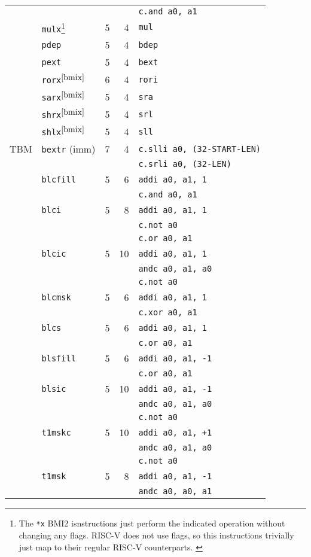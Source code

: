\begin{longtable}[c]{@{}llrrl@{}}
     &                        &   &    & {\tt c.and a0, a1}\tabularnewline
\cline{2-5}
     & {\tt mulx}\footnote{
         The \texttt{*x} BMI2 isnstructions just perform the indicated operation without
	 changing any flags. RISC-V does not use flags, so this instructions trivially
	 just map to their regular RISC-V counterparts.
                \label{bmix}} & 5 &  4 & {\tt mul}\tabularnewline
\cline{2-5}
     & {\tt pdep}             & 5 &  4 & {\tt bdep}\tabularnewline
\cline{2-5}
     & {\tt pext}             & 5 &  4 & {\tt bext}\tabularnewline
\cline{2-5}
     & {\tt rorx}$^{\ref{bmix}}$ & 6 &  4 & {\tt rori}\tabularnewline
\cline{2-5}
     & {\tt sarx}$^{\ref{bmix}}$ & 5 &  4 & {\tt sra}\tabularnewline
\cline{2-5}
     & {\tt shrx}$^{\ref{bmix}}$ & 5 &  4 & {\tt srl}\tabularnewline
\cline{2-5}
     & {\tt shlx}$^{\ref{bmix}}$ & 5 &  4 & {\tt sll}\tabularnewline
\midrule
TBM  & {\tt bextr} (imm)      & 7 &  4 & {\tt c.slli a0, (32-START-LEN)}\tabularnewline
     &                        &   &    & {\tt c.srli a0, (32-LEN)}\tabularnewline
\cline{2-5}
     & {\tt blcfill}          & 5 &  6 & {\tt addi a0, a1, 1}\tabularnewline
     &                        &   &    & {\tt c.and a0, a1}\tabularnewline
\cline{2-5}
     & {\tt blci}             & 5 &  8 & {\tt addi a0, a1, 1}\tabularnewline
     &                        &   &    & {\tt c.not a0}\tabularnewline
     &                        &   &    & {\tt c.or a0, a1}\tabularnewline
\cline{2-5}
     & {\tt blcic}            & 5 & 10 & {\tt addi a0, a1, 1}\tabularnewline
     &                        &   &    & {\tt andc a0, a1, a0}\tabularnewline
     &                        &   &    & {\tt c.not a0}\tabularnewline
\cline{2-5}
     & {\tt blcmsk}           & 5 &  6 & {\tt addi a0, a1, 1}\tabularnewline
     &                        &   &    & {\tt c.xor a0, a1}\tabularnewline
\cline{2-5}
     & {\tt blcs}             & 5 &  6 & {\tt addi a0, a1, 1}\tabularnewline
     &                        &   &    & {\tt c.or a0, a1}\tabularnewline
\cline{2-5}
     & {\tt blsfill}          & 5 &  6 & {\tt addi a0, a1, -1}\tabularnewline
     &                        &   &    & {\tt c.or a0, a1}\tabularnewline
\cline{2-5}
     & {\tt blsic}            & 5 & 10 & {\tt addi a0, a1, -1}\tabularnewline
     &                        &   &    & {\tt andc a0, a1, a0}\tabularnewline
     &                        &   &    & {\tt c.not a0}\tabularnewline
\cline{2-5}
     & {\tt t1mskc}           & 5 & 10 & {\tt addi a0, a1, +1}\tabularnewline
     &                        &   &    & {\tt andc a0, a1, a0}\tabularnewline
     &                        &   &    & {\tt c.not a0}\tabularnewline
\cline{2-5}
     & {\tt t1msk}            & 5 &  8 & {\tt addi a0, a1, -1}\tabularnewline
     &                        &   &    & {\tt andc a0, a0, a1}\tabularnewline
\bottomrule
\end{longtable}

